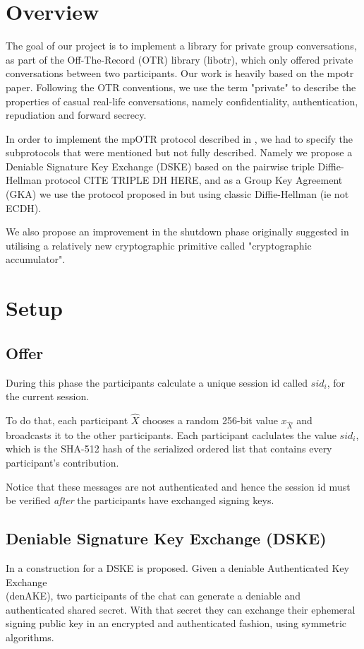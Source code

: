 \documentclass[12pt,titlepage,a4paper]{article}
\begin{document}
{
\section{Overview}

The goal of our project is to implement a library for private group conversations, as part of the Off-The-Record (OTR) library (libotr), which only offered private conversations between two participants. Our work is heavily based on the mpotr \cite{mpotr} paper. Following the OTR conventions, we use the term "private" to describe the properties of casual real-life conversations, namely confidentiality, authentication, repudiation and forward secrecy.

In order to implement the mpOTR protocol described in \cite{mpotr}, we had to specify the subprotocols that were mentioned but not fully described. Namely we propose a Deniable Signature Key Exchange (DSKE) based on the pairwise triple Diffie-Hellman protocol CITE TRIPLE DH HERE, and as a  Group Key Agreement (GKA) we use the protocol proposed in \cite{mpenc} but using classic Diffie-Hellman (ie not ECDH).

We also propose an improvement in the shutdown phase originally suggested in \cite{mpotr}
utilising a relatively new cryptographic primitive called "cryptographic accumulator".

\section{Setup}

\subsection{Offer}
\label{Offer}
During this phase the participants calculate a unique session id called $sid_i$,
for the current session.

To do that, each participant $\hat{X}$ chooses a random 256-bit value $x_{\hat{X}}$ and broadcasts
it to the other participants. Each participant caclulates the value $sid_i$,
which is the SHA-512 hash of the serialized ordered list that contains every
participant's contribution.

Notice that these messages are not authenticated and hence the session id must
be verified \emph{after} the participants have exchanged signing keys.



\subsection{Deniable Signature Key Exchange (DSKE)}
\label{DSKE}
In \cite{mpotr} a construction for a DSKE is proposed. Given a deniable
Authenticated Key Exchange\\ (denAKE), two participants of the chat can
generate a deniable and authenticated shared secret. With that secret
they can exchange their ephemeral signing public key in an encrypted and
authenticated fashion, using symmetric algorithms.\\

}
\end{document}
